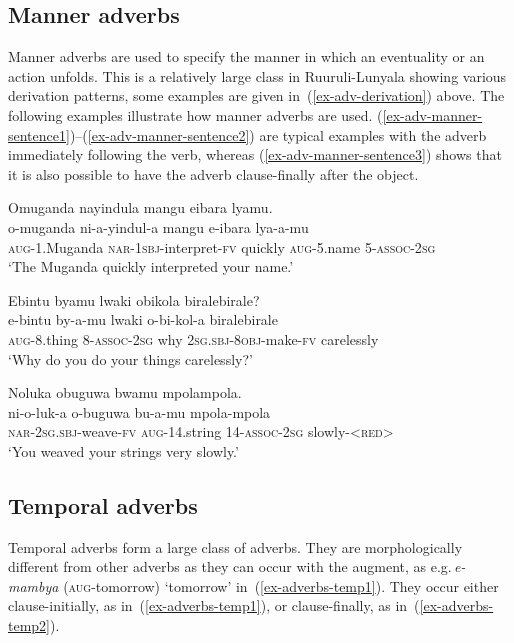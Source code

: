 \subsection{Manner adverbs} \label{sec-syntax-adverbs-manner}

Manner adverbs are used to specify the manner in which an eventuality or an action unfolds. 
This is a relatively large class in Ruuruli-Lunyala showing various derivation patterns, some examples are given in~(\ref{ex-adv-derivation}) above. 
The following examples illustrate how manner adverbs are used. 
(\ref{ex-adv-manner-sentence1})–(\ref{ex-adv-manner-sentence2}) are typical examples with the adverb immediately following the verb, whereas (\ref{ex-adv-manner-sentence3}) shows that it is also possible to have the adverb clause-finally after the object. 

\ea \label{ex-adv-manner-sentence}
\begin{xlist}
\ex 	\label{ex-adv-manner-sentence1}
	\glll Omuganda nayindula mangu eibara lyamu.\\
  	o-muganda 		ni-a-yindul-a 			mangu e-ibara 	lya-a-mu\\
		\textsc{aug}-1.Muganda 	\textsc{nar}-\textsc{1sbj}-interpret-\textsc{fv} 	quickly \textsc{aug}-5.name 	5-\textsc{assoc}-2\textsc{sg}\\
	\glt ‘The Muganda quickly interpreted your name.’ 

\ex 	\label{ex-adv-manner-sentence2}
 	\glll Ebintu byamu lwaki obikola biralebirale?\\
		 e-bintu by-a-mu lwaki o-bi-kol-a biralebirale\\
		\textsc{aug}-8.thing 8-\textsc{assoc}-2\textsc{sg} why 2\textsc{sg.sbj}-\textsc{8obj}-make-\textsc{fv} carelessly\\
\glt ‘Why do you do your things carelessly?'

\ex 	\label{ex-adv-manner-sentence3}
	\glll Noluka obuguwa bwamu mpolampola.\\
	ni-o-luk-a 		o-buguwa 		bu-a-mu 	mpola-mpola\\
	\textsc{nar}-2\textsc{sg.sbj}-weave-\textsc{fv} 	\textsc{aug}-14.string 	14-\textsc{assoc}-2\textsc{sg} 	slowly-<\textsc{red}>\\
	\glt ‘You weaved your strings very slowly.' 	
\end{xlist}
\z


\subsection{Temporal adverbs} \label{sec-syntax-adverbs-temporal}
Temporal adverbs form a large class of adverbs. They are morphologically different from other adverbs as they can occur with the augment, as e.g.\,\emph{e-mambya} (\textsc{aug}-tomorrow) `tomorrow' in~(\ref{ex-adverbs-temp1}). 
They occur either clause-initially, as in~(\ref{ex-adverbs-temp1}), or clause-finally, as in~(\ref{ex-adverbs-temp2}).

